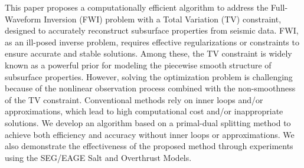 This paper proposes a computationally efficient algorithm to address the Full-Waveform Inversion (FWI) problem with a Total Variation (TV) constraint, designed to accurately reconstruct subsurface properties from seismic data.
FWI, as an ill-posed inverse problem, requires effective regularizations or constraints to ensure accurate and stable solutions.
Among these, the TV constraint is widely known as a powerful prior for modeling the piecewise smooth structure of subsurface properties.
However, solving the optimization problem is challenging because of the nonlinear observation process combined with the non-smoothness of the TV constraint.
Conventional methods rely on inner loops and/or approximations, which lead to high computational cost and/or inappropriate solutions.
We develop an algorithm based on a primal-dual splitting method to achieve both efficiency and accuracy without inner loops or approximations.
We also demonstrate the effectiveness of the proposed method through experiments using the SEG/EAGE Salt and Overthrust Models.
